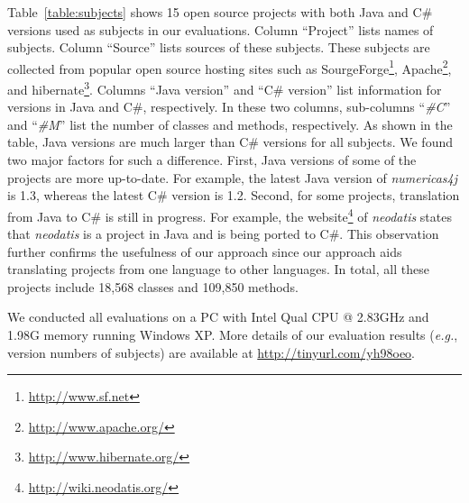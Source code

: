 Table~\ref{table:subjects} shows 15 open source projects with both Java and
C\# versions used as subjects in our evaluations.
Column ``Project'' lists names of subjects. Column ``Source'' lists sources of these
subjects. These subjects are collected from popular open source hosting sites such
as SourgeForge\footnote{\url{http://www.sf.net}},
Apache\footnote{\url{http://www.apache.org/}}, and
hibernate\footnote{\url{http://www.hibernate.org/}}. Columns ``Java
version'' and ``C\# version'' list information for versions in Java and
C\#, respectively. In these two columns, sub-columns
``\emph{\#C}'' and ``\emph{\#M}'' list the number of classes and methods, respectively. As shown
in the table, Java versions are much larger than C\# versions
for all subjects. We found two major factors for such
a difference. First, Java versions of some of the
projects are more up-to-date. For example, the latest Java
version of \emph{numericas4j} is 1.3, whereas the latest C\# version
is 1.2. Second, for some projects, translation from Java to C\# is still in
progress. For example, the
website\footnote{\url{http://wiki.neodatis.org/}} of \emph{neodatis}
states that \emph{neodatis} is a project in Java and is being ported
to C\#. This observation further confirms the usefulness of our
approach since our approach aids translating projects from one language to other
languages. In total, all these projects include 18,568 classes and 109,850
methods.

We conducted all evaluations on a PC with Intel Qual CPU @
2.83GHz and 1.98G memory running Windows XP. More details of our
evaluation results (\emph{e.g.}, version numbers of subjects) are available at \url{http://tinyurl.com/yh98oeo}.

